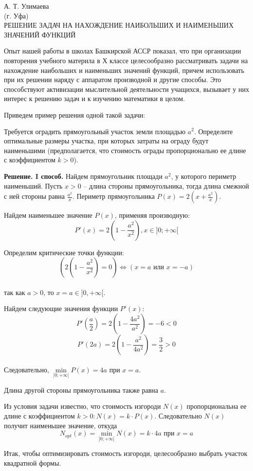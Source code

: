 \documentclass{article}
\begin{document}
\pagestyle{fancy}
А. Т. Улимаева
\\(г. Уфа)
\\РЕШЕНИЕ ЗАДАЧ НА НАХОЖДЕНИЕ НАИБОЛЬШИХ И НАИМЕНЬШИХ ЗНАЧЕНИЙ ФУНКЦИЙ
\par Опыт нашей работы в школах Башкирской АССР показал, что при организации повторения учебного материла в Х классе целесообразно рассматривать задачи на нахождение наибольших и наименьших значений функций, причем использовать при их решении наряду с аппаратом производной и другие способы. Это способствуют активизации мыслительной деятельности учащихся, вызывает у них интерес к решению задач и к изучению математики в целом.
\par Приведем пример решения одной такой задачи:
\par Требуется оградить прямоугольный участок земли площадью $a^2$. Определите оптимальные размеры участка, при которых затраты на ограду будут наименьшими (предполагается, что стоимость ограды пропорционально ее длине с коэффициентом $k>0$).
\par\textbf{Решение. I способ.} Найдем прямоугольник площади $a^2$, у которого периметр наименьший. Пусть $x>0$ -- длина стороны прямоугольника, тогда длина смежной с ней стороны равна $\frac{a^2}{x}$. Периметр прямоугольника $P(x)=2(x+\frac{a^2}{x})$.
\par Найдем наименьшее значение $P(x)$, применяя производную:
$$P'(x)=2(1-\frac{a^2}{x^2}), x\in]0;+\infty[$$
\par Определим критические точки функции:
$$(2(1-\frac{a^2}{x^2})=0)\Leftrightarrow(x=a\mbox{ или }x=-a)$$
\\так как $a>0$, то $x=a\in]0,+\infty[$.
\par Найдем следующие значения функции $P'(x)$:
$$P'(\frac{a}{2})=2(1-\frac{4a^2}{a^2})=-6<0$$
$$P'(2a)=2(1-\frac{a^2}{4a^2})=\frac{3}{2}>0$$
\\Следовательно, $\min\limits_{]0;+\infty[}P(x)=4a$ при $x=a$.
\par Длина другой стороны прямоугольника также равна $a$.
\par Из условия задачи известно, что стоимость изгороди $N(x)$ пропорциональна ее длине с коэффициентом $k>0:N(x)=k\cdot P(x)$. Следовательно $N(x)$ получит наименьшее значение, откуда 
$$N_{opt}(x)=\min\limits_{]0;+\infty[}N(x)=k\cdot4a\mbox{ при }x=a$$
\par Итак, чтобы оптимизировать стоимость изгороди, целесообразно выбрать участок квадратной формы.
\end{document}
